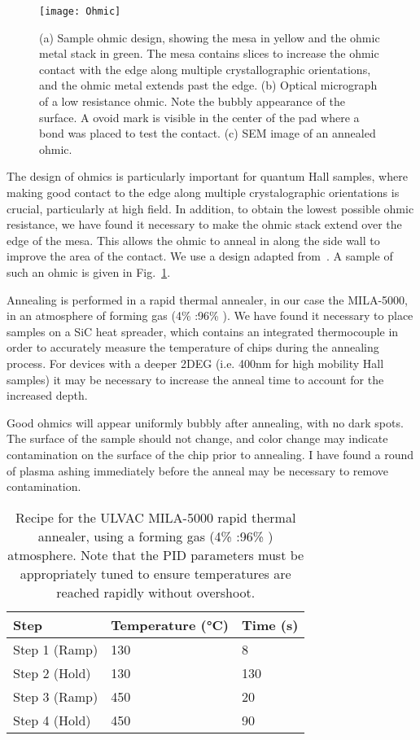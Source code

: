 \begin{figure}
    \texttt{[image: Ohmic]}
    \caption[Sample ohmic design and anneal]
    {\label{fig:ohmic}(a) Sample ohmic design, showing the mesa in yellow and the ohmic metal stack in green. The mesa contains slices
    to increase the ohmic contact with the edge along multiple crystallographic orientations, and the ohmic metal extends past the edge.
    (b) Optical micrograph of a low resistance ohmic. Note the bubbly appearance of the surface. A ovoid mark is visible in the center of the
    pad where a bond was placed to test the contact. (c) SEM image of an annealed ohmic.}
\end{figure}

The design of ohmics is particularly important for quantum Hall samples, where making good contact to the edge along multiple
crystalographic orientations is crucial, particularly at high field. In addition, to obtain the lowest possible ohmic resistance,
we have found it necessary to make the ohmic stack extend over the edge of the mesa. This allows the ohmic to anneal in along the
side wall to improve the area of the contact. We use a design adapted from~\cite{2007PhDTM}. A sample of such an ohmic is given in Fig.~\ref{fig:ohmic}.

Annealing is performed in a rapid thermal annealer, in our case the MILA-5000, in an atmosphere of forming gas (4\% :96\% ).
We have found it necessary to place samples on a SiC heat spreader, which contains an integrated thermocouple in order to accurately
measure the temperature of chips during the annealing process. For devices with a deeper 2DEG (i.e. 400nm for high mobility Hall samples)
it may be necessary to increase the anneal time to account for the increased depth.

Good ohmics will appear uniformly bubbly after annealing, with no dark spots. The surface of the sample should not change, and color change
may indicate contamination on the surface of the chip prior to annealing. I have found a round of plasma ashing immediately before the anneal
may be necessary to remove contamination.

\begin{table}
    \centering
    \begin{tabular}{|l|l|l|}
        \hline
        Step & Temperature (\si{\celsius}) & Time (\si{\second}) \\
        \hline
        Step 1 (Ramp) & 130 & 8 \\ \hline
        Step 2 (Hold) & 130 & 130 \\ \hline
        Step 3 (Ramp) & 450 & 20 \\ \hline
        Step 4 (Hold) & 450 & 90 \\
        \hline
    \end{tabular}
    \caption[Rapid thermal anneal recipe]
    {Recipe for the ULVAC MILA-5000 rapid thermal annealer, using a forming gas (4\% :96\% ) atmosphere. Note that the PID parameters must be appropriately tuned
    to ensure temperatures are reached rapidly without overshoot.}
    \label{tab:anneal}
\end{table}

